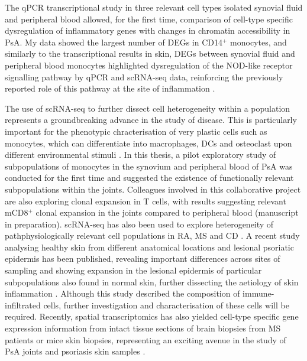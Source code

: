 The qPCR transcriptional study in three relevant cell types isolated synovial fluid and peripheral blood allowed, for the first time, comparison of cell-type specific dysregulation of inflammatory genes with changes in chromatin accessibility in PsA. My data showed the largest number of DEGs in CD14$^+$ monocytes, and similarly to the transcriptional results in skin, DEGs between synovial fluid and peripheral blood monocytes highlighted dysregulation of the NOD-like receptor signalling pathway by qPCR and scRNA-seq data, reinforcing the previously reported role of this pathway at the site of inflammation \parencite{McCormack2009}.

The use of scRNA-seq to further dissect cell heterogeneity within a population represents a groundbreaking advance in the study of disease. This is particularly important for the phenotypic chracterisation of very plastic cells such as monocytes, which can differentiate into macrophages, DCs and osteoclast upon different environmental stimuli \parencite{Qu2014,Rivollier2012}. In this thesis, a pilot exploratory study of subpopulations of monocytes in the synovium and peripheral blood of PsA was conducted for the first time and suggested the existence of functionally relevant subpopulations within the joints. Colleagues involved in this collaborative project are also exploring clonal expansion in T cells, with results suggesting relevant mCD8$^+$ clonal expansion in the joints compared to peripheral blood (manuscript in preparation). scRNA-seq has also been used to explore heterogeneity of pathphysiologically relevant cell populations in RA, MS and CD \parencite{Fumitaka2018,Zhang2018,Schafflick2018}. A recent study analysing healthy skin from different anatomical locations and lesional psoriatic epidermis has been published, revealing important differences across sites of sampling and showing expansion in the lesional epidermis of particular subpopulations also found in normal skin, further dissecting the aetiology of skin inflammation \parencite{Cheng2018}. Although this study described the composition of immune-infiltrated cells, further investigation and characterisation of these cells will be required. Recently, spatial transcriptomics has also yielded cell-type specific gene expression information from intact tissue sections of brain biopsies from MS patients or mice skin biopsies,  representing an exciting avenue in the study of PsA joints and psoriasis skin samples \parencite{Itoh2018,Joost2016}. 


